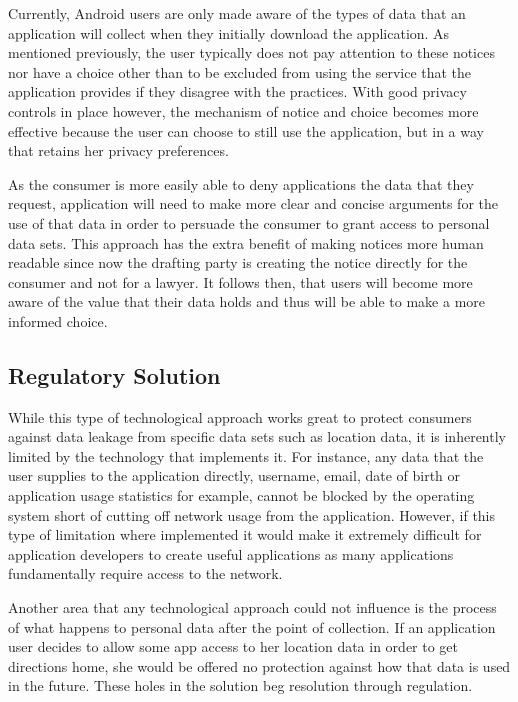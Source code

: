 Currently, Android users are only made aware of the types of data that an application will collect when they initially download the application. As mentioned previously, the user typically does not pay attention to these notices nor have a choice other than to be excluded from using the service that the application provides if they disagree with the practices.
With good privacy controls in place however, the mechanism of notice and choice becomes more effective because the user can choose to still use the application, but in a way that retains her privacy preferences.

As the consumer is more easily able to deny applications the data that they request, application will need to make more clear and concise arguments for the use of that data in order to persuade the consumer to grant access to personal data sets. This approach has the extra benefit of making notices more human readable since now the drafting party is creating the notice directly for the consumer and not for a lawyer. 
It follows then, that users will become more aware of the value that their data holds and
thus will be able to make a more informed choice.


 	\subsection{Regulatory Solution}

While this type of technological approach works great to protect consumers against data leakage from specific data sets such as location data, it is inherently limited by the technology that implements it. For instance, any data that the user supplies to the application directly, username, email, date of birth or application usage statistics for example, cannot be blocked by the operating system short of cutting off network usage from the application.
However, if this type of limitation where implemented it would make it extremely difficult for application developers to create useful applications as many applications fundamentally require access to the network. 

Another area that any technological approach could not influence is the process of what happens to personal data after the point of collection. If an application user decides to allow some app access to her location data in order to get directions home, she would be offered no protection against how that data is used in the future. These holes in the solution beg resolution through regulation. 

